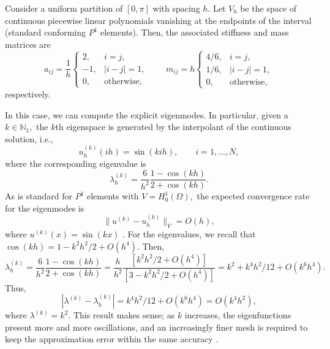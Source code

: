 \documentclass[12pt,a4paper]{article}
\theoremstyle{boldthm}
\theoremstyle{bolddefn}
\begin{document}
Consider a uniform partition of $[0, \pi]$ with spacing $h.$ Let $V_h$ be the space of continuous piecewise linear polynomials vanishing at the endpoints of the interval (standard conforming $P^1$ elements). Then, the associated stiffness and mass matrices are
\begin{equation}
a_{ij}
=
\frac{1}{h}
\begin{cases}
2, & i=j,\\
-1, & |i-j|=1,\\
0, & \text{otherwise},
\end{cases}
\qquad
m_{ij}
=
h
\begin{cases}
4/6, & i=j,\\
1/6, & |i-j|=1,\\
0, & \text{otherwise},
\end{cases}
\end{equation}
respectively.

In this case, we can compute the explicit eigenmodes. In particular, given a $k \in \mathbb{N}_1,$ the $k$th eigenspace is generated by the interpolant of the continuous solution, i.e., \cite{boffi}
\begin{equation}
u_h^{(k)}(ih) = \sin(kih), \qquad i = 1, \dots, N,
\end{equation}
where the corresponding eigenvalue is
\begin{equation}
\lambda_h^{(k)} = \frac{6}{h^2} \frac{1 - \cos(kh)}{2 + \cos(kh)}.
\end{equation}
As is standard for $P^1$ elements with $V = H_0^1(\Omega),$ the expected convergence rate for the eigenmodes is
\begin{equation}
\| u^{(k)}  - u_h^{(k)} \|_V = O(h),
\end{equation}
where $u^{(k)}(x) = \sin(kx)$ \cite{boffi}.
For the eigenvalues, we recall that $\cos(kh) = 1 - k^2h^2/2 + O(h^4).$ Then,
\begin{equation}
\lambda_h^{(k)} = \frac{6}{h^2} \frac{1 - \cos(kh)}{2 + \cos(kh)} = \frac{h}{h^2} \frac{ [k^2h^2/2 + O(h^4)] }{[3 - k^2h^2/2 + O(h^4)] } = k^2 + k^4h^2/12 + O(k^6 h^4).
\end{equation}
Thus,
\begin{equation}
| \lambda^{(k)} - \lambda_h^{(k)} | = k^4h^2/12 + O(k^6 h^4) = O(k^4 h^2),
\end{equation}
where $\lambda^{(k)} = k^2.$
This result makes sense; as $k$ increases, the eigenfunctions present more and more oscillations, and an increasingly finer mesh is required to keep the approximation error within the same accuracy \cite{boffi}.
\end{document}

